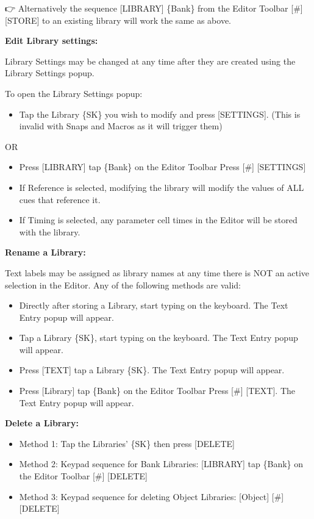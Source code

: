 \documentclass[
]{article}
\providecommand{\tightlist}{%
  \setlength{\itemsep}{0pt}\setlength{\parskip}{0pt}}
\begin{document}
👉 Alternatively the sequence {[}LIBRARY{]} \{Bank\} from the Editor Toolbar {[}\#{]} {[}STORE{]} to an existing library will work the same as above.

\textbf{Edit Library settings:}

Library Settings may be changed at any time after they are created using the Library Settings popup.

To open the Library Settings popup:

\begin{itemize}
\tightlist
\item
  Tap the Library \{SK\} you wish to modify and press {[}SETTINGS{]}. (This is invalid with Snaps and Macros as it will trigger them)
\end{itemize}

OR

\begin{itemize}
\item
  Press {[}LIBRARY{]} tap \{Bank\} on the Editor Toolbar Press {[}\#{]} {[}SETTINGS{]}
\item
  If Reference is selected, modifying the library will modify the values of ALL cues that reference it.
\item
  If Timing is selected, any parameter cell times in the Editor will be stored with the library.
\end{itemize}

\textbf{Rename a Library:}

Text labels may be assigned as library names at any time there is NOT an active selection in the Editor. Any of the following methods are valid:

\begin{itemize}
\item
  Directly after storing a Library, start typing on the keyboard. The Text Entry popup will appear.
\item
  Tap a Library \{SK\}, start typing on the keyboard. The Text Entry popup will appear.
\item
  Press {[}TEXT{]} tap a Library \{SK\}. The Text Entry popup will appear.
\item
  Press {[}Library{]} tap \{Bank\} on the Editor Toolbar Press {[}\#{]} {[}TEXT{]}. The Text Entry popup will appear.
\end{itemize}

\textbf{Delete a Library:}

\begin{itemize}
\item
  Method 1: Tap the Libraries' \{SK\} then press {[}DELETE{]}
\item
  Method 2: Keypad sequence for Bank Libraries: {[}LIBRARY{]} tap \{Bank\} on the Editor Toolbar {[}\#{]} {[}DELETE{]}
\item
  Method 3: Keypad sequence for deleting Object Libraries: {[}Object{]} {[}\#{]} {[}DELETE{]}
\end{itemize}
\end{document}

